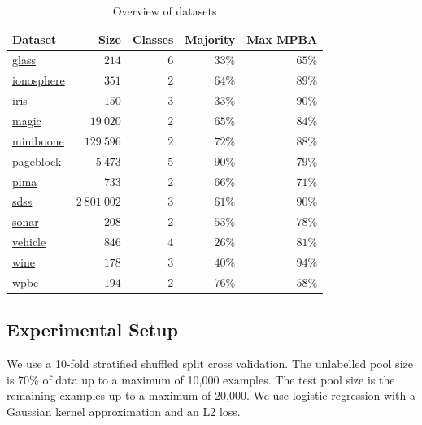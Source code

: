 \documentclass[fleqn,10pt,lineno]{wlpeerj} %
\begin{document}
\begin{table}[h]
	\caption {Overview of datasets} \label{tab:datasets}
	\centering
	\begin{tabular}{lrrrr}
		\toprule
		{Dataset}  & Size &  Classes & Majority & Max MPBA \\
		\midrule
        \href{https://archive.ics.uci.edu/ml/datasets/Glass+Identification}{glass}
        	& $214$ & $6$ & $33\%$ & $65\%$ \\
		\href{https://archive.ics.uci.edu/ml/datasets/Ionosphere}{ionosphere}
        	& $351$ & $2$ & $64\%$ & $89\%$ \\
        \href{https://archive.ics.uci.edu/ml/datasets/Iris}{iris}
        	& $150$ & $3$ & $33\%$ & $90\%$ \\
        \href{https://archive.ics.uci.edu/ml/datasets/MAGIC+Gamma+Telescope}{magic}
        	& $19~020$ & $2$ & $65\%$ & $84\%$ \\
        \href{https://archive.ics.uci.edu/ml/datasets/MiniBooNE+particle+identification}{miniboone}
        	& $129~596$ & $2$ & $72\%$ & $88\%$ \\
        \href{https://archive.ics.uci.edu/ml/datasets/Page+Blocks+Classification}{pageblock}
        	& $5~473$ & $5$ & $90\%$ & $79\%$ \\
		\href{https://archive.ics.uci.edu/ml/datasets/Pima+Indians+Diabetes}{pima}
        	& $733$ & $2$ & $66\%$ & $71\%$ \\
        \href{http://dx.doi.org/10.5281/zenodo.58500}{sdss}
        	& $2~801~002$ & $3$ & $61\%$ & $90\%$ \\
		\href{https://archive.ics.uci.edu/ml/datasets/Connectionist+Bench+(Sonar,+Mines+vs.+Rocks)}{sonar}
        	& $208$ & $2$ & $53\%$ & $78\%$ \\
        \href{https://archive.ics.uci.edu/ml/datasets/Statlog+(Vehicle+Silhouettes)}{vehicle}
        	& $846$ & $4$ & $26\%$ & $81\%$ \\
        \href{https://archive.ics.uci.edu/ml/datasets/Wine}{wine}
        	& $178$ & $3$ & $40\%$ & $94\%$ \\
		\href{https://archive.ics.uci.edu/ml/datasets/Breast+Cancer+Wisconsin+(Prognostic)}{wpbc}
        	& $194$ & $2$ & $76\%$ & $58\%$ \\
		\bottomrule
	\end{tabular}
\end{table}

\subsection*{Experimental Setup}
We use a 10-fold stratified shuffled split cross validation. The unlabelled
pool size is 70\% of data up to a maximum of 10,000 examples. The test pool
size is the remaining examples up to a maximum of 20,000. We use logistic
regression with a Gaussian kernel approximation and an L2 loss.
\end{document}
